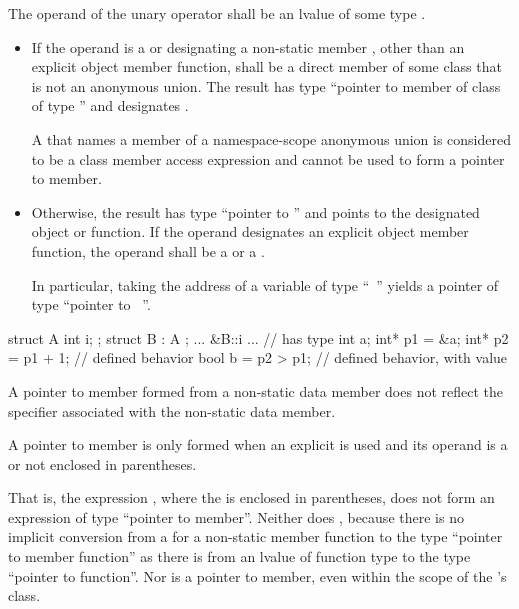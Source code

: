 \pnum
{}%
%
The operand of the unary \tcode{\&} operator
shall be an lvalue of some type .
\begin{itemize}
\item
If the operand is a  or 
designating a non-static member ,
other than an explicit object member function,
 shall be a direct member of some class 
that is not an anonymous union.
The result has type ``pointer to member of class  of type ''
and designates .
\begin{note}
A 
that names a member of a namespace-scope anonymous union
is considered to be a class member access expression
and cannot be used to form a pointer to member.
\end{note}
\item
Otherwise, the result has type ``pointer to '' and points to
the designated object or function.
If the operand designates an explicit object member function,
the operand shall be
a  or a .
\begin{note}
In particular, taking the address of a variable of type ``\cv{}~''
yields a pointer of type ``pointer to \cv{}~''.
\end{note}
\end{itemize}
\begin{example}
\begin{codeblock}
struct A { int i; };
struct B : A { };
... &B::i ...       // has type 
int a;
int* p1 = &a;
int* p2 = p1 + 1;   // defined behavior
bool b = p2 > p1;   // defined behavior, with value 
\end{codeblock}
\end{example}
\begin{note}
A pointer to member formed from a  non-static data
member does not reflect the  specifier
associated with the non-static data member.
\end{note}

\pnum
A pointer to member is only formed when an explicit \tcode{\&} is used
and its operand is
a  or 
not enclosed in parentheses.
\begin{note}
That is, the expression , where the
 is enclosed in parentheses, does not form an
expression of type ``pointer to member''. Neither does
, because there is no implicit conversion from a
 for a non-static member function to the type
``pointer to member function'' as there is from an lvalue of function
type to the type ``pointer to function''. Nor is
 a pointer to member, even within the scope of
the 's class.
\end{note}

